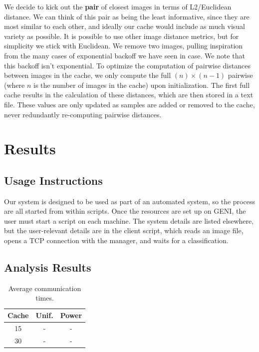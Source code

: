 \documentclass[12pt]{article}
\begin{document}
We decide to kick out the \textbf{pair} of closest images in terms of L2/Euclidean distance. We can think of this pair as being the least informative, since they are most similar to each other, and ideally our cache would include as much visual variety as possible. It is possible to use other image distance metrics, but for simplicity we stick with Euclidean. We remove two images, pulling inspiration from the many cases of exponential backoff we have seen in case. We note that this backoff isn't exponential. To optimize the computation of pairwise distances between images in the cache, we only compute the full $(n) \times (n-1)$ pairwise (where $n$ is the number of images in the cache) upon initialization. The first full cache results in the calculation of these distances, which are then stored in a text file. These values are only updated as samples are added or removed to the cache, never redundantly re-computing pairwise distances.

\section{Results}

\subsection{Usage Instructions}

Our system is designed to be used as part of an automated system, so the process are all started from within scripts.
Once the resources are set up on GENI, the user must start a script on each machine.
The system details are listed elsewhere, but the user-relevant details are in the client script, which reads an image file, opens a TCP connection with the manager, and waits for a classification.

\subsection{Analysis Results}

\begin{table}
    \begin{tabular}{|c|c|c|}
        \hline
        Cache & Unif. & Power \\ \hline
        15 & - & - \\ \hline
        30 & - & - \\ \hline
    \end{tabular}
    \label{table}
    \caption{Average communication times.}%
\end{table}
\end{document}
